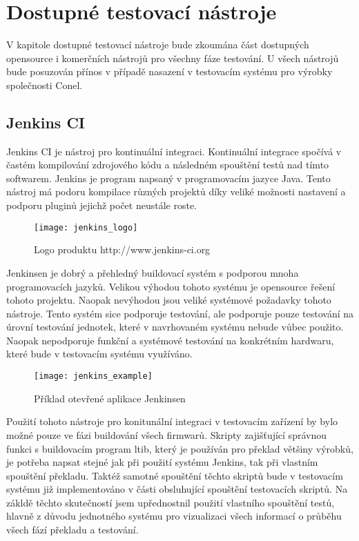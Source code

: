 \chapter{Dostupné testovací nástroje}
V kapitole dostupné testovací nástroje bude zkoumána část dostupných opensource i komerčních nástrojů pro všechny fáze testování. U všech nástrojů bude posuzován přínos v případě nasazení v testovacím systému pro výrobky společnosti Conel.

\section{Jenkins CI}
Jenkins CI je nástroj pro kontinuální integraci. Kontinuální integrace spočívá v častém kompilování zdrojového kódu a následném spouštění testů nad tímto softwarem.
Jenkins je program napsaný v programovacím jazyce Java. Tento nástroj má podoru kompilace různých projektů díky veliké možnosti nastavení a podporu pluginů jejichž počet neustále roste.

\begin{figure}[h]
  \centering
  \texttt{[image: jenkins\_logo]}
  \caption{Logo produktu http://www.jenkins-ci.org}
  \label{fig:testlink_logo}
\end{figure}

Jenkinsen je dobrý a přehledný buildovací systém s podporou mnoha programovacích jazyků. Velikou výhodou tohoto systému je opensource řešení tohoto projektu. Naopak nevýhodou jsou veliké systémové požadavky tohoto nástroje. Tento systém sice podporuje testování, ale podporuje pouze testování na úrovní testování jednotek, které v navrhovaném systému nebude vůbec použito. Naopak nepodporuje funkční a systémové testování na konkrétním hardwaru, které bude v testovacím systému využíváno.

\begin{figure}[h]
  \centering
  \texttt{[image: jenkins\_example]}
  \caption{Příklad otevřené aplikace Jenkinsen}
  \label{fig:testlink_example}
\end{figure}

Použití tohoto nástroje pro konitunální integraci v testovacím zařízení by bylo možné pouze ve fázi buildování všech firmwarů. Skripty zajišťující správnou funkci s buildovacím program ltib, který je používán pro překlad většiny výrobků, je potřeba napsat stejné jak při použití systému Jenkins, tak při vlastním spouštění překladu. Taktéž samotné spouštění těchto skriptů bude v testovacím systému již implementováno v části obsluhující spouštění testovacích skriptů. Na zákldě těchto skutečností jsem upřednostnil použití vlastního spouštění testů, hlavně z důvodu jednotného systému pro vizualizaci všech informací o průběhu všech fází překladu a testování.

